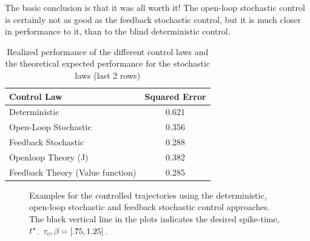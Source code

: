 \documentclass{article}
\begin{document}
The basic conclusion is that it was all worth it! The open-loop stochastic
control is certainly not as good as the feedback stochastic control, but it is much closer in performance to
it, than to the blind deterministic control. 

\begin{table}[h] 
\centering
\begin{tabular}{lc}
Control Law & Squared Error \\
\hline
Deterministic &  0.621 \\
Open-Loop Stochastic & 0.356 \\
Feedback Stochastic &  0.288\\
\hline
Openloop Theory (J) & 0.382
\\
Feedback Theory (Value function) & 0.285
\end{tabular}
\caption{Realized performance of the different control laws and the theoretical
expected performance for the stochastic laws (last 2 rows)}
\label{tab:realized_avg_errors_det_vs_openloop_vs_stoch}
\end{table}
\begin{figure}[h]
\begin{center}
\caption[]{Examples for the controlled trajectories using the deterministic,
open-loop stochastic and feedback stochastic control approaches. The
black vertical line in the plots indicates the desired spike-time, ${ t^* }$. ${ \tau_{c} },
{\beta} = [.75, 1.25]$.}
\label{fig:control_trajectories_examples_with_openloop}
\end{center}
\end{figure}
\end{document}
